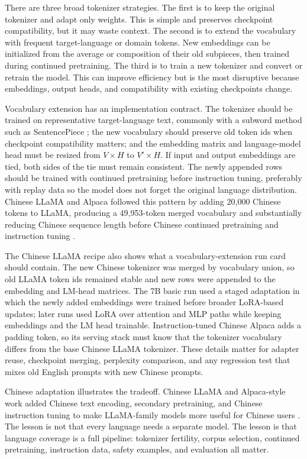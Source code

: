 There are three broad tokenizer strategies. The first is to keep the original tokenizer and adapt only weights. This is simple and preserves checkpoint compatibility, but it may waste context. The second is to extend the vocabulary with frequent target-language or domain tokens. New embeddings can be initialized from the average or composition of their old subpieces, then trained during continued pretraining. The third is to train a new tokenizer and convert or retrain the model. This can improve efficiency but is the most disruptive because embeddings, output heads, and compatibility with existing checkpoints change.

Vocabulary extension has an implementation contract. The tokenizer should be trained on representative target-language text, commonly with a subword method such as SentencePiece \cite{kudo2018sentencepiece}; the new vocabulary should preserve old token ids when checkpoint compatibility matters; and the embedding matrix and language-model head must be resized from $V\times H$ to $V'\times H$. If input and output embeddings are tied, both sides of the tie must remain consistent. The newly appended rows should be trained with continued pretraining before instruction tuning, preferably with replay data so the model does not forget the original language distribution. Chinese LLaMA and Alpaca followed this pattern by adding 20,000 Chinese tokens to LLaMA, producing a 49,953-token merged vocabulary and substantially reducing Chinese sequence length before Chinese continued pretraining and instruction tuning \cite{cui2023efficient}.

The Chinese LLaMA recipe also shows what a vocabulary-extension run card should contain. The new Chinese tokenizer was merged by vocabulary union, so old LLaMA token ids remained stable and new rows were appended to the embedding and LM-head matrices. The 7B basic run used a staged adaptation in which the newly added embeddings were trained before broader LoRA-based updates; later runs used LoRA over attention and MLP paths while keeping embeddings and the LM head trainable. Instruction-tuned Chinese Alpaca adds a padding token, so its serving stack must know that the tokenizer vocabulary differs from the base Chinese LLaMA tokenizer. These details matter for adapter reuse, checkpoint merging, perplexity comparison, and any regression test that mixes old English prompts with new Chinese prompts.

Chinese adaptation illustrates the tradeoff. Chinese LLaMA and Alpaca-style work added Chinese text encoding, secondary pretraining, and Chinese instruction tuning to make LLaMA-family models more useful for Chinese users \cite{cui2023efficient}. The lesson is not that every language needs a separate model. The lesson is that language coverage is a full pipeline: tokenizer fertility, corpus selection, continued pretraining, instruction data, safety examples, and evaluation all matter.

